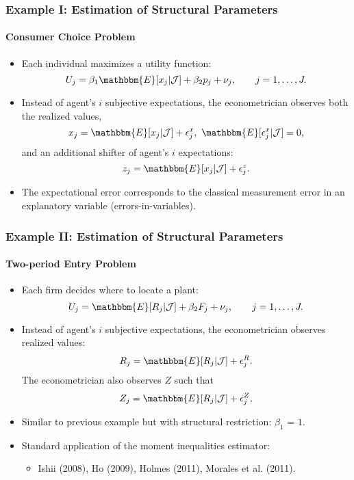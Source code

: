 \begin{frame}
\frametitle{Example I: Estimation of Structural Parameters}
\framesubtitle{Consumer Choice Problem}

\begin{itemize}
	\item Each individual maximizes a utility function:
	\begin{equation*}
	U_{j}=\beta_{1}\mathbbm{E}[x_{j}|\mathcal{J}] +\beta_{2}p_{j}+ \nu_{j},\qquad  j = 1,\dots,J.
	\end{equation*}
	\item Instead of agent's $i$ subjective expectations, the econometrician observes both the realized values,
	\begin{equation*}
	x_{j} = \mathbbm{E}[x_{j}|\mathcal{J}] + \epsilon^{x}_{j},\text{ $\mathbbm{E}[\epsilon^{x}_{j}|\mathcal{J}]=0$,}
	\end{equation*}
	and an additional shifter of agent's $i$ expectations:
	\begin{equation*}
	z_{j} = \mathbbm{E}[x_{j}|\mathcal{J}] + \epsilon^{z}_{j}.
	\end{equation*}
	\item The expectational error corresponds to the classical measurement error in an explanatory variable (errors-in-variables).
\end{itemize}
\end{frame}
\begin{frame}
\frametitle{Example II: Estimation of Structural Parameters}
\framesubtitle{Two-period Entry Problem}

\begin{itemize}
	\item Each firm decides where to locate a plant:
	\begin{equation*}
	U_{j}=\mathbbm{E}[R_{j}|\mathcal{J}] +\beta_{2}F_{j}+ \nu_{j},\qquad  j = 1,\dots,J.
	\end{equation*}
	\item Instead of agent's $i$ subjective expectations, the econometrician observes realized values:
	\begin{equation*}
	R_{j} = \mathbbm{E}[R_{j}|\mathcal{J}] + \epsilon^{R}_{j}.
	\end{equation*}
	The econometrician also observes $Z$ such that
	\begin{equation*}
	Z_{j} = \mathbbm{E}[R_{j}|\mathcal{J}] + \epsilon^{Z}_{j},
	\end{equation*}
	\item Similar to previous example but with structural restriction: $\beta_{1}$ = $1$.
	\item Standard application of the moment inequalities estimator:
	\begin{itemize}
		\item Ishii (2008), Ho (2009), Holmes (2011), Morales et al. (2011).
	\end{itemize}
\end{itemize}
\end{frame}
